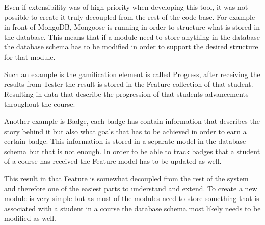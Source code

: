 Even if extensibility was of high priority when developing this tool, it was not
possible to create it truly decoupled from the rest of the code base. For example
in front of MongoDB, Mongoose is running in order to structure what is stored in
the database. This means that if a module need to store anything in the database
the database schema has to be modified in order to support the desired structure
for that module.

Such an example is the gamification element is called Progress, after
receiving the results from Tester the result is stored in the Feature collection
of that student. Resulting in data that describe the progression of that students
advancements throughout the course.

Another example is Badge, each badge has contain information that describes the
story behind it but also what goals that has to be achieved in order to earn a
certain badge. This information is stored in a separate model in the database
schema but that is not enough. In order to be able to track badges that a student
of a course has received the Feature model has to be updated as well.

This result in that Feature is somewhat decoupled from the rest of the system and
therefore one of the easiest parts to understand and extend. To create a new module
is very simple but as most of the modules need to store something that is associated
with a student in a course the database schema most likely needs to be modified as well.
